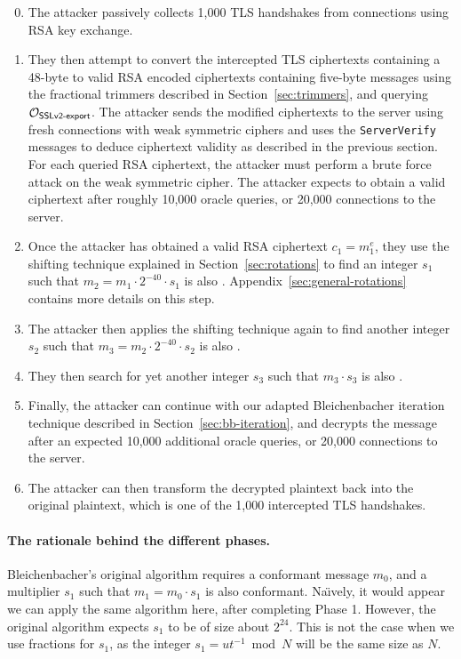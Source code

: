 \begin{enumerate}
 \setcounter{enumi}{-1}
	\item The attacker passively collects 1,000 TLS handshakes from
	connections using RSA key exchange.

	\item They then attempt to convert the intercepted TLS ciphertexts containing a 48-byte \pms to valid RSA \PKCS encoded ciphertexts containing five-byte messages using the fractional trimmers described in Section~\ref{sec:trimmers}, and querying $\mathcal{O}_\textsf{SSLv2-export}$. The attacker sends the modified ciphertexts to the server using fresh \ssltwo connections with weak symmetric ciphers and uses the \texttt{ServerVerify} messages to deduce ciphertext validity as described in the previous section. For each queried RSA ciphertext, the attacker must perform a brute force attack on the weak symmetric cipher. The attacker expects to obtain a valid \ssltwo ciphertext after roughly 10,000 oracle queries, or 20,000 connections to the server.

	\item Once the attacker has obtained a valid \ssltwo RSA ciphertext
	$c_1 = m_1^e$, they use the shifting technique explained in
	Section~\ref{sec:rotations} to find an integer $s_1$ such that
	$m_2 = m_1 \cdot 2^{-40} \cdot s_1$ is also \sslconform.
	Appendix~\ref{sec:general-rotations} contains more details on this step.

	\item The attacker then applies the shifting technique again to find
	another integer $s_2$ such that $m_3 = m_2 \cdot 2^{-40} \cdot s_2$
	is also \sslconform.

	\item They then search for yet another integer $s_3$ such that
	$m_3 \cdot s_3$ is also \sslconform.

	\item Finally, the attacker can continue with our adapted Bleichenbacher
	iteration technique described in Section~\ref{sec:bb-iteration}, and
	decrypts the message after an expected 10,000 additional oracle queries,
	or 20,000 connections to the server.

	\item The attacker can then transform the decrypted plaintext back into
	the original plaintext, which is one of the 1,000 intercepted TLS 		handshakes.

\end{enumerate}

\paragraph{The rationale behind the different phases.}
Bleichenbacher's original algorithm requires a conformant message $m_0$, and a multiplier $s_1$ such that $m_1 = m_0 \cdot s_1$ is also conformant.
Na\"{\i}vely, it would appear we can apply the same algorithm here, after completing Phase 1.
However, the original algorithm expects $s_1$ to be of size about $2^{24}$. This is not the case when we use fractions for $s_1$, as the integer $s_1 = u t^{-1} \bmod N$ will be the same size as $N$.

